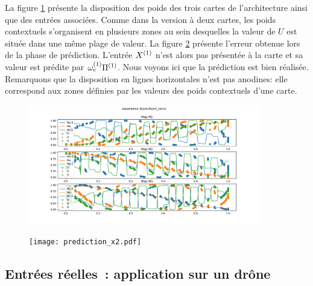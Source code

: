 \documentclass[../main]{subfiles}
\begin{document}
La figure \ref{fig:w_cercle} présente la disposition des poids des trois cartes de l'architecture ainsi que des entrées associées. Comme dans la version à deux cartes, les poids contextuels s'organisent en plusieurs zones au sein desquelles la valeur de $U$ est située dans une même plage de valeur. La figure \ref{fig:pred_cercle} présente l'erreur obtenue lors de la phase de prédiction. L'entrée $X^{({1})}$ n'est alors pas présentée à la carte et sa valeur est prédite par $\omega_{e}^{({1})}{\Pi^{({1})}}$. Nous voyons ici que la prédiction est bien réalisée. Remarquons que la disposition en lignes horizontales n'est pas anodines: elle correspond aux zones définies par les valeurs des poids contextuels d'une carte.

\begin{figure}
	\centering\includegraphics[width=0.9\textwidth]{3som_cercle_w.pdf}
	\caption{\label{fig:w_cercle}}
\end{figure}



\begin{figure}
	\texttt{[image: prediction\_x2.pdf]}
	\caption{\label{fig:pred_cercle}}
\end{figure}





\subsection{Entrées réelles~: application sur un drône}
\end{document}
